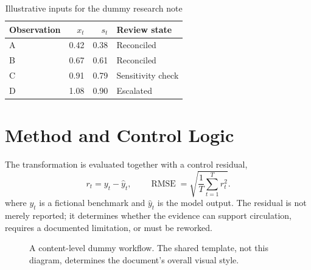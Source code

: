 \documentclass[conference]{IEEEtran}
\begin{document}
\begin{table}[!t]
  \caption{Illustrative inputs for the dummy research note}
  \label{tab:dummy-inputs}
  \centering
  \begin{tabular}{lrrl}
    \toprule
    Observation & $x_t$ & $s_t$ & Review state \\
    \midrule
    A & 0.42 & 0.38 & Reconciled \\
    B & 0.67 & 0.61 & Reconciled \\
    C & 0.91 & 0.79 & Sensitivity check \\
    D & 1.08 & 0.90 & Escalated \\
    \bottomrule
  \end{tabular}
\end{table}

\section{Method and Control Logic}

\lipsum[2]

The transformation is evaluated together with a control residual,
\begin{equation}
  r_t = y_t - \widehat{y}_t,
  \qquad
  \operatorname{RMSE} =
  \sqrt{\frac{1}{T}\sum_{t=1}^{T} r_t^2}.
  \label{eq:dummy-rmse}
\end{equation}
where $y_t$ is a fictional benchmark and $\widehat{y}_t$ is the model output.
The residual is not merely reported; it determines whether the evidence can
support circulation, requires a documented limitation, or must be reworked.

\begin{figure}[!t]
  \centering
  \caption{A content-level dummy workflow. The shared template, not this
  diagram, determines the document's overall visual style.}
  \label{fig:dummy-workflow}
\end{figure}
\end{document}
